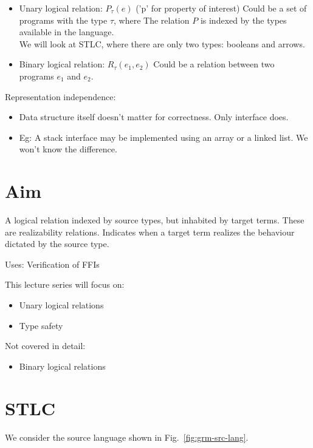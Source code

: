 \documentclass{article}
\begin{document}
\begin{itemize}
\item Unary logical relation: $P_\tau(e)$ ('p' for property of interest)
  Could be a set of programs with the type $\tau$, where
  The relation $P$ is indexed by the types available in the
  language.\\
  We will look at STLC, where there are only two types: booleans and arrows.
\item Binary logical relation: $R_\tau(e_1, e_2)$
  Could be a relation between two programs $e_1$ and $e_2$.
\end{itemize}

Representation independence:
\begin{itemize}
\item
  Data structure itself doesn't matter for correctness.
  Only interface does.
\item
  Eg: A stack interface may be implemented using an array or a
  linked list. We won't know the difference.
\end{itemize}

\section{Aim}
A logical relation indexed by source types, but inhabited by target terms.
These are realizability relations.
Indicates when a target term realizes the behaviour dictated by the source type.  

Uses: Verification of FFIs 

This lecture series will focus on:
\begin{itemize}
\item Unary logical relations
\item Type safety
\end{itemize}

Not covered in detail:
\begin{itemize}
\item Binary logical relations
\end{itemize}

\section{STLC}
We consider the source language shown in Fig.~\ref{fig:grm-src-lang}.
\end{document}
